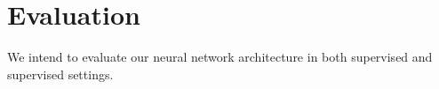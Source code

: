 \documentclass[twoside,twocolumn]{article}
\begin{document}





\section{Evaluation}
We intend to evaluate our neural network architecture in both supervised and
supervised settings.





\end{document}
